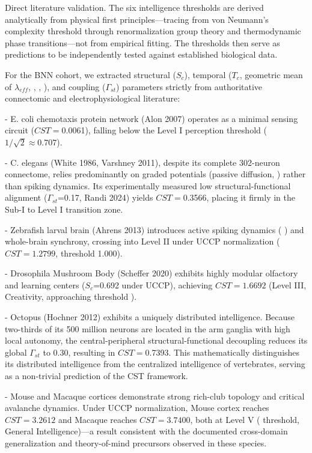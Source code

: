 \documentclass[a4paper,12pt]{article}
\begin{document}
Direct literature validation. The six intelligence thresholds are derived analytically from physical first principles---tracing from von Neumann's complexity threshold through renormalization group theory and thermodynamic phase transitions---not from empirical fitting. The thresholds then serve as predictions to be independently tested against established biological data.

For the BNN cohort, we extracted structural ($S_{c}$), temporal ($T_{c}$, geometric mean of $\lambda_{eff}$, \Phi, \Psi, \Theta), and coupling ($\Gamma_{st}$) parameters strictly from authoritative connectomic and electrophysiological literature:

- E. coli chemotaxis protein network (Alon 2007) operates as a minimal sensing circuit ($CST = $0.0061), falling below the Level I perception threshold ($1/\sqrt{2} \approx 0.707$).

- C. elegans (White 1986, Varshney 2011), despite its complete 302-neuron connectome, relies predominantly on graded potentials (passive diffusion,  ) rather than spiking dynamics. Its experimentally measured low structural-functional alignment ($\Gamma_{st}$=0.17, Randi 2024) yields $CST = $0.3566, placing it firmly in the Sub-I to Level I transition zone.

- Zebrafish larval brain (Ahrens 2013) introduces active spiking dynamics ( ) and whole-brain synchrony, crossing into Level II under UCCP normalization ($CST = 1.2799$, threshold 1.000).

- Drosophila Mushroom Body (Scheffer 2020) exhibits highly modular olfactory and learning centers ($S_{c}$=0.692 under UCCP), achieving $CST = 1.6692$ (Level III, Creativity, approaching threshold  ).

- Octopus (Hochner 2012) exhibits a uniquely distributed intelligence. Because two-thirds of its 500 million neurons are located in the arm ganglia with high local autonomy, the central-peripheral structural-functional decoupling reduces its global $\Gamma_{st}$ to 0.30, resulting in $CST = $0.7393. This mathematically distinguishes its distributed intelligence from the centralized intelligence of vertebrates, serving as a non-trivial prediction of the CST framework.

- Mouse and Macaque cortices demonstrate strong rich-club topology and critical avalanche dynamics. Under UCCP normalization, Mouse cortex reaches $CST = 3.2612$ and Macaque reaches $CST = 3.7400$, both at Level V ( \pi  threshold, General Intelligence)---a result consistent with the documented cross-domain generalization and theory-of-mind precursors observed in these species.
\end{document}
